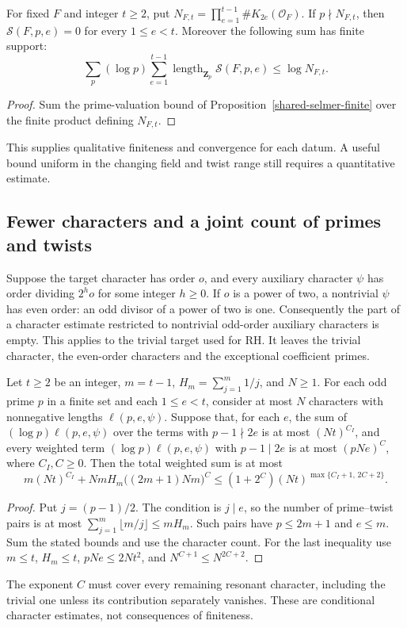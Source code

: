 \begin{corollary}\label{shared-selmer-finite-support}
For fixed \(F\) and integer \(t\ge2\), put
\(N_{F,t}=\prod_{e=1}^{t-1}\#K_{2e}(\mathcal O_F)\).
If \(p\nmid N_{F,t}\), then \(\mathcal S(F,p,e)=0\) for
every \(1\le e<t\).  Moreover the following sum has finite support:
\[
 \sum_p(\log p)\sum_{e=1}^{t-1}
        \operatorname{length}_{\mathbf Z_p}\mathcal S(F,p,e)
                  \le\log N_{F,t}.
\]
\end{corollary}
\begin{proof}
Sum the prime-valuation bound of Proposition~\ref{shared-selmer-finite}
over the finite product defining \(N_{F,t}\).
\end{proof}
This supplies qualitative finiteness and convergence for each datum.
A useful bound uniform in the changing field and twist range still
requires a quantitative estimate.

\subsection{Fewer characters and a joint count of primes and twists}

Suppose the target character has order \(o\), and every auxiliary
character \(\psi\) has order dividing \(2^h o\) for some integer
\(h\ge0\).  If \(o\) is a power of two, a nontrivial \(\psi\)
has even order: an odd divisor of a power of two is one.  Consequently
the part of a character estimate restricted to nontrivial odd-order
auxiliary characters is empty.  This applies to the trivial target
used for RH.  It leaves the trivial character, the even-order
characters and the exceptional coefficient primes.

\begin{proposition}\label{shared-prime-twist-count}
Let \(t\ge2\) be an integer, \(m=t-1\), \(H_m=\sum_{j=1}^m1/j\), and
\(N\ge1\).  For each odd prime \(p\) in a finite set and each
\(1\le e<t\), consider at most \(N\) characters with nonnegative
lengths \(\ell(p,e,\psi)\).  Suppose that, for each \(e\), the
sum of \((\log p)\ell(p,e,\psi)\) over the terms with
\(p-1\nmid2e\) is at most \((Nt)^{C_I}\), and every weighted term
\((\log p)\ell(p,e,\psi)\) with \(p-1\mid2e\) is at most
\((pNe)^C\), where \(C_I,C\ge0\).
Then the total weighted sum is at most
\[
 m(Nt)^{C_I}+NmH_m\bigl((2m+1)Nm\bigr)^C
       \le(1+2^C)(Nt)^{\max\{C_I+1,\,2C+2\}}.
\]
\end{proposition}
\begin{proof}
Put \(j=(p-1)/2\).  The condition is \(j\mid e\), so the
number of prime--twist pairs is at most
\(\sum_{j=1}^m\lfloor m/j\rfloor\le mH_m\).
Such pairs have \(p\le2m+1\) and \(e\le m\).
Sum the stated bounds and use the character count.
For the last inequality use \(m\le t\), \(H_m\le t\),
\(pNe\le2Nt^2\), and \(N^{C+1}\le N^{2C+2}\).
\end{proof}
The exponent \(C\) must cover every remaining resonant character,
including the trivial one unless its contribution separately vanishes.
These are conditional character estimates, not consequences of finiteness.

